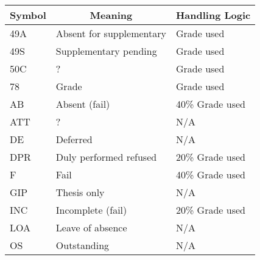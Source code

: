 \begin{table}[H]
  \centering
  \label{PercentTreatment}
  \begin{tabular}{|l|l|l|}
    \hline
    \multicolumn{1}{|c|}{\textbf{Symbol}} & \multicolumn{1}{c|}{\textbf{Meaning}} & \multicolumn{1}{c|}{\textbf{Handling Logic}} \\
    \hline
    49A                                   & Absent for supplementary              & Grade used                                   \\
    49S                                   & Supplementary pending                 & Grade used                                   \\
    50C                                   & ?                                     & Grade used                                   \\
    78                                    & Grade                                 & Grade used                                   \\
    AB                                    & Absent (fail)                         & 40\% Grade used                              \\
    ATT                                   & ?                                     & N/A                                          \\
    DE                                    & Deferred                              & N/A                                          \\
    DPR                                   & Duly performed refused                & 20\% Grade used                              \\
    F                                     & Fail                                  & 40\% Grade used                              \\
    GIP                                   & Thesis only                           & N/A                                          \\
    INC                                   & Incomplete (fail)                     & 20\% Grade used                              \\
    LOA                                   & Leave of absence                      & N/A                                          \\
    OS                                    & Outstanding                           & N/A                                          \\

\end{tabular}
\end{table}

